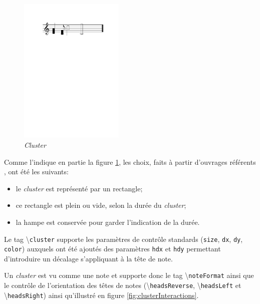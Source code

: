 \documentclass{article}
\newenvironment{gmncode}	{\vspace{-2mm}\small\verbatim}{\endverbatim\vspace{-2mm}}
\newcommand{\code}[1]		{{\small \texttt{#1}}}
\newcommand{\guidotag}[1]	{\textbackslash\code{#1}}
\begin{document}
\begin{figure}[h]
\centering
\begin{gmncode}
[
  \cluster({a, d} {c/8, f}
      {a/2, d2} {f/1, c1})
]
\end{gmncode}
\includegraphics[width=50mm]{img/partitions/cluster.pdf}
\caption{\emph{Cluster}}
\label{fig:cluster}
\end{figure}
%

Comme l'indique en partie la figure \ref{fig:cluster}, les choix, faits à partir d'ouvrages référents \cite{gould2011behind,stone1980music}, ont été les suivants:
\begin{itemize}
	\item le \emph{cluster} est représenté par un rectangle;
	\item ce rectangle est plein ou vide, selon la durée du \emph{cluster};
	\item la hampe est conservée pour garder l'indication de la durée.
\end{itemize}

Le tag \guidotag{cluster} supporte les paramètres de contrôle standards (\code{size}, \code{dx}, \code{dy}, \code{color}) auxquels ont été ajoutés des paramètres \code{hdx} et \code{hdy} permettant d'introduire un décalage s'appliquant à la tête de note. 

Un \emph{cluster} est vu comme une note et supporte donc le tag \guidotag{noteFormat} ainsi que le contrôle de l'orientation des têtes de notes (\guidotag{headsReverse}, \guidotag{headsLeft} et \guidotag{headsRight}) ainsi qu'illustré en figure \ref{fig:clusterInteractions}.
\end{document}
